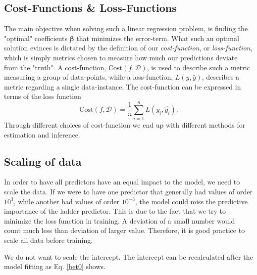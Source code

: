 
\subsection{Cost-Functions \& Loss-Functions}
The main objective when solving such a linear regression problem, is finding the "optimal" coefficients $\boldsymbol{\beta}$ that minimizes the error-term. 
What such an optimal solution evinces is dictated by the definition of our \textit{cost-function},  or \textit{loss-function}, which is simply metrics chosen to measure how much our predictions deviate from the "truth". 
A cost-function, $\text{Cost}(f,\mathcal{D} )$, is used to describe such a metric measuring a group of data-points, while a loss-function, $L(y, \hat{y})$, describes a metric regarding a single data-instance. 
The cost-function can be expressed in terms of the loss function
\begin{equation}
\text{Cost}(f,\mathcal{D}) = \frac{1}{n}\sum_{i=1}^n L(y_i, \hat{y_i}).
\end{equation}
Through different choices of cost-function we end up with different methods for estimation and inference. 





\subsection{Scaling of data}

In order to have all predictors have an equal impact to the model, we need to scale the data.  If we were to have one predictor that generally had values of order $10^3$, while another had values of order $10^{-3}$, the model could miss the predictive importance of the ladder predictor. This is due to the fact that we try to minimize the loss function in training. A deviation of a small number would count much less than deviation of larger value. Therefore, it is good practice to scale all data before training. 

We do not want to scale the intercept.  The intercept can be recalculated after the model fitting as Eq. \ref{bet0} shows.


